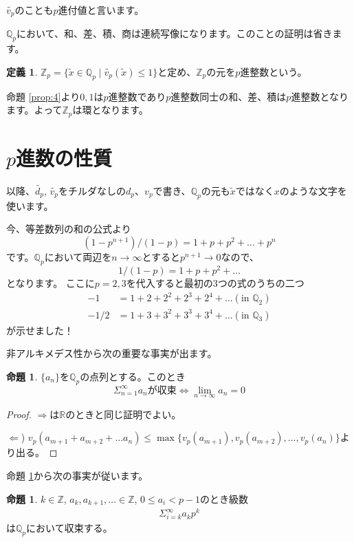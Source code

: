 \documentclass[uplatex]{jsarticle}
\newcommand{\Z}{\mathbb{Z}}
\newcommand{\Q}{\mathbb{Q}}
\newcommand{\R}{\mathbb{R}}
\theoremstyle{definition} %
\newtheorem{defi}[thm]{定義}
\newtheorem{prop}[thm]{命題}
\begin{document}
$\tilde{v_p}$のことも$p$進付値と言います。

$\Q_p$において、和、差、積、商は連続写像になります。このことの証明は省きます。

\begin{oframed}\begin{defi}
$\Z_p = \{\tilde{x} \in \Q_p \mid \tilde{v_p}(\tilde{x}) \le 1 \}$と定め、$\Z_p$の元を$p$進整数という。
\end{defi}\end{oframed}

命題 \ref{prop:4}より$0, 1$は$p$進整数であり$p$進整数同士の和、差、積は$p$進整数となります。よって$\Z_p$は環となります。

\section{$p$進数の性質}

以降、$\tilde{d_p}$, $\tilde{v_p}$をチルダなしの$d_p$、$v_p$で書き、$\Q_p$の元も$\tilde{x}$ではなく$x$のような文字を使います。

今、等差数列の和の公式より
\[(1-p^{n+1}) / (1-p) = 1 + p + p^2 + \dots + p^n\]
です。$\Q_p$において両辺を$n \to \infty$とすると$p^{n+1} \to 0$なので、
\[1 / (1-p) = 1 + p + p^2 + \dots\]
となります。
ここに$p = 2, 3$を代入すると最初の3つの式のうちの二つ
\begin{align*}
-1 &= 1 + 2 + 2^2 + 2^3 + 2^4 + \dots (\text{in } \Q_2) \\
-1/2 &= 1 + 3 + 3^2 + 3^3 + 3^4 + \dots (\text{in } \Q_3)
\end{align*}
が示せました！

非アルキメデス性から次の重要な事実が出ます。

\begin{oframed}\begin{prop}\label{prop:3}
$\{a_n\}$を$\Q_p$の点列とする。このとき
\[\Sigma_{n=1}^\infty a_n が収束 \iff \lim_{n\to\infty} a_n = 0\]
\end{prop}\end{oframed}
\begin{proof}
$\Rightarrow$は$\R$のときと同じ証明でよい。

$\Leftarrow$) $v_p(a_{m+1} + a_{m+2} + \dots a_n) \leq \max\{v_p(a_{m+1}),  v_p(a_{m+2}), \dots, v_p(a_n)\}$より出る。
\end{proof}

命題 \ref{prop:3}から次の事実が従います。

\begin{oframed}\begin{prop}
$k \in \Z$, $a_k, a_{k+1}, \dots \in \Z$, $0 \le a_i < p-1$のとき級数
\begin{align}
\Sigma_{i=k}^\infty a_k p^k \label{eq:1}
\end{align}
は$\Q_p$において収束する。
\end{prop}\end{oframed}
\end{document}
